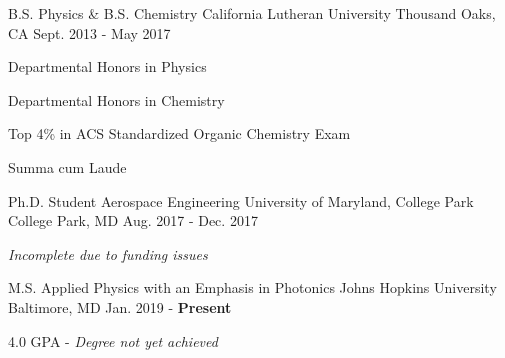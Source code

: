 

\begin{cventries}

  \cventry
    {B.S. Physics \& B.S. Chemistry} %
    {California Lutheran University} %
    {Thousand Oaks, CA} %
    {Sept. 2013 - May 2017} %
    {
      \begin{cvitems} %
        \item {Departmental Honors in Physics}
        \item {Departmental Honors in Chemistry}
 		\item {Top 4\% in ACS Standardized Organic Chemistry Exam}
        \item {Summa cum Laude}
      \end{cvitems}
    }
%

  \cventry
	{Ph.D. Student Aerospace Engineering} %
	{University of Maryland, College Park} %
	{College Park, MD} %
	{Aug. 2017 - Dec. 2017} %
	{
		\begin{cvitems} %
			\item {\textit{Incomplete due to funding issues}}
		\end{cvitems}
	}

  \cventry
	{M.S. Applied Physics with an Emphasis in Photonics} %
	{Johns Hopkins University} %
	{Baltimore, MD} %
	{Jan. 2019 - \textbf{Present}} %
	{
		\begin{cvitems} %
			\item {4.0 GPA - \textit{Degree not yet achieved}}
		\end{cvitems}
	}
\end{cventries}
